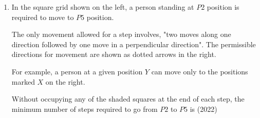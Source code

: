 \documentclass[journal]{IEEEtran}
\begin{document}
\begin{enumerate}
The above frequency chart shows the frequency distribution of marks obtained by a set of students in an exam.

From the data presented above, which one of the following is CORRECT? \hfill(2022)
\begin{multicols}{2}
\begin{enumerate}
\item mean$>$mode$>$median
\item mode$>$median$>$mean
\item mode$>$mean$>$median
\item median$>$mode$>$mean
\end{enumerate}
\end{multicols}


\item In the square grid shown on the left, a person standing at $P2$ position is required to move to $P5$ position.

The only movement allowed for a step involves, "two moves along one direction followed by one move in a perpendicular direction". The permissible directions for movement are shown as dotted arrows in the right.

For example, a person at a given position $Y$ can move only to the positions marked $X$ on the right.

Without occupying any of the shaded squares at the end of each step, the minimum number of steps required to go from $P2$ to $P5$ is \hfill(2022)



\end{enumerate}
\end{document}
